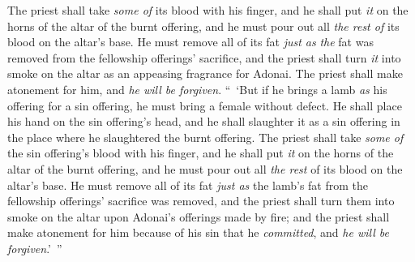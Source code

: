 \begin{biblechapter}
\verse The priest shall take \textit{some of} its blood with his finger, and he shall put \textit{it} on the horns of the altar of the burnt offering, and he must pour out all \textit{the rest of} its blood on the altar’s base.
\verse He must remove all of its fat \textit{just as} \textit{the} fat was removed from the fellowship offerings’ sacrifice, and the priest shall turn \textit{it} into smoke on the altar as an appeasing fragrance for Adonai. The priest shall make atonement for him, and \textit{he will be forgiven}.
\verse “ ‘But if he brings a lamb \textit{as} his offering for a sin offering, he must bring a female without defect.
\verse He shall place his hand on the sin offering’s head, and he shall slaughter it as a sin offering in the place where he slaughtered the burnt offering.
\verse The priest shall take \textit{some of} the sin offering’s blood with his finger, and he shall put \textit{it} on the horns of the altar of the burnt offering, and he must pour out all \textit{the rest} of its blood on the altar’s base.
\verse He must remove all of its fat \textit{just as} the lamb’s fat from the fellowship offerings’ sacrifice was removed, and the priest shall turn them into smoke on the altar upon Adonai’s offerings made by fire; and the priest shall make atonement for him because of his sin that he \textit{committed}, and \textit{he will be forgiven}.’ ”
\end{biblechapter}

